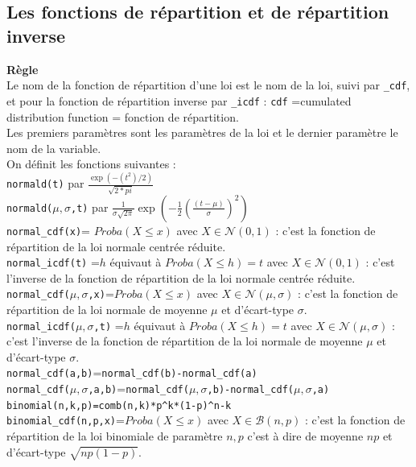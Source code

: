\documentclass[a4paper,11pt]{book}
\begin{document}
\subsection{Les fonctions de r\'epartition et de r\'epartition inverse}
{\bf R\`egle}\\
Le nom de la fonction de r\'epartition 
d'une loi est le nom de la loi, suivi par {\tt \_cdf}, et pour la fonction de 
r\'epartition inverse par {\tt \_icdf} : {\tt cdf} =cumulated distribution 
function = fonction de r\'epartition.\\
Les premiers param\`etres sont les param\`etres de la loi et le dernier 
param\`etre le nom de la variable.\\
On d\'efinit les fonctions suivantes :\\
{\tt normald(t)} par $\displaystyle \frac{\exp(-(t^2)/2)}{\sqrt{2*pi}}$\\
{\tt normald($\mu,\sigma$,t)} par $\displaystyle \frac{1}{\sigma\sqrt{2\pi}}\exp(-\frac{1}{2}(\frac{(t-\mu)}{\sigma})^2)$\\
{\tt normal\_cdf(x)}= $Proba(X\leq x)$ avec $X\in \mathcal N(0,1)$ : c'est la 
fonction de r\'epartition de la loi normale centr\'ee r\'eduite.\\
{\tt normal\_icdf(t)} =$h$ \'equivaut \`a $Proba(X\leq h)=t$ avec 
$X\in \mathcal N(0,1)$ : c'est l'inverse de la fonction de r\'epartition de la 
loi normale centr\'ee r\'eduite.\\
{\tt normal\_cdf($\mu,\sigma$,x)}=$Proba(X\leq x)$ avec $X\in \mathcal N(\mu,\sigma)$ :
c'est la fonction de r\'epartition de la loi normale
 de moyenne $\mu$ et d'\'ecart-type $\sigma$.\\
{\tt normal\_icdf($\mu,\sigma$,t)} =$h$ \'equivaut \`a $Proba(X\leq h)=t$ avec
 $X\in \mathcal N(\mu,\sigma)$ : c'est l'inverse de la fonction de 
r\'epartition de la loi normale de moyenne $\mu$ et d'\'ecart-type $\sigma$.\\
{\tt normal\_cdf(a,b)}={\tt normal\_cdf(b)-normal\_cdf(a)}\\
{\tt normal\_cdf($\mu,\sigma$,a,b)}={\tt normal\_cdf($\mu,\sigma$,b)-normal\_cdf($\mu,\sigma$,a)}\\
{\tt binomial(n,k,p)=comb(n,k)*p\verb|^|k*(1-p)\verb|^|{n-k}}\\
{\tt binomial\_cdf(n,p,x)}=$Proba(X \leq x)$ avec $X\in \mathcal B(n,p)$ :
c'est la fonction de r\'epartition de la loi binomiale
de param\`etre $n,p$ c'est \`a dire
 de moyenne $np$ et d'\'ecart-type $\sqrt{np(1-p)}$.\\
\end{document}
